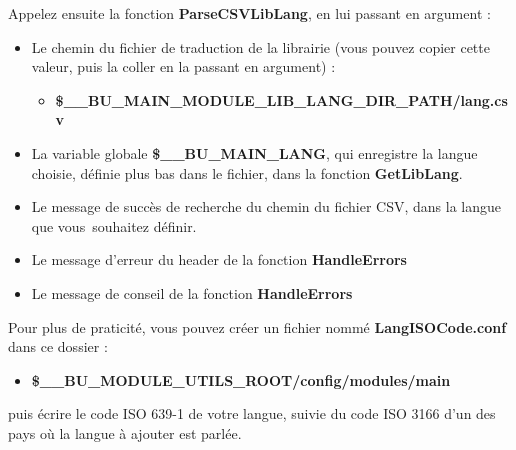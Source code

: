 \documentclass[a4paper,10pt]{article}
\begin{document}
\begin{justify}
    Appelez ensuite la fonction \textbf{\color{mauve}ParseCSVLibLang}, en lui passant en argument :

    \begin{itemize}
        \item Le chemin du fichier de traduction de la librairie (vous pouvez copier cette valeur, puis la coller en la passant en argument) :
        \begin{itemize}
            \item \textbf{\color{orange}\$\_\_BU\_MAIN\_MODULE\_LIB\_LANG\_DIR\_PATH\color{lime}/lang.csv}\\
        \end{itemize}

        \item La variable globale \textbf{\color{orange}\$\_\_BU\_MAIN\_LANG}, qui enregistre la langue choisie, définie plus bas dans le fichier, dans la fonction \textbf{\color{mauve}GetLibLang}.\\

        \item Le message de succès de recherche du chemin du fichier CSV, dans la langue que vous\ souhaitez définir.\\

        \item Le message d'erreur du header de la fonction \textbf{\color{mauve}HandleErrors}\\

        \item Le message de conseil de la fonction \textbf{\color{mauve}HandleErrors}
    \end{itemize}
\end{justify}

\begin{justify}
    Pour plus de praticité, vous pouvez créer un fichier nommé \textbf{\color{lime}LangISOCode.conf} dans ce dossier :
    
    \begin{itemize}
        \item \textbf{\color{orange}\$\_\_BU\_MODULE\_UTILS\_ROOT\color{lime}/config/modules/main}
    \end{itemize}
\end{justify}

\begin{justify}
    puis écrire le code ISO 639-1 de votre langue, suivie du code ISO 3166 d'un des pays où la langue à ajouter est parlée.
\end{justify}
\end{document}
